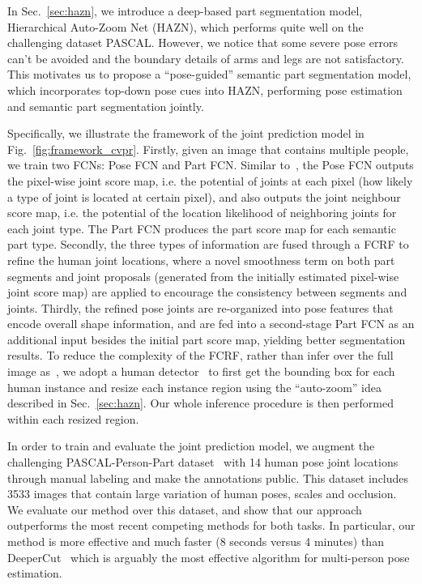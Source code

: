 In Sec.~\ref{sec:hazn}, we introduce a deep-based part segmentation model, Hierarchical Auto-Zoom Net (HAZN), which performs quite well on the challenging dataset PASCAL. However, we notice that some severe pose errors can't be avoided and the boundary details of arms and legs are not satisfactory.
This motivates us to propose a ``pose-guided'' semantic part segmentation model, which incorporates top-down pose cues into HAZN, performing pose estimation and semantic part segmentation jointly.

Specifically, we illustrate the framework of the joint prediction model in Fig.~\ref{fig:framework_cvpr}.
Firstly, given an image that contains multiple people, we train two FCNs: Pose FCN and Part FCN.
Similar to~\cite{insafutdinov2016deepercut}, the Pose FCN outputs the pixel-wise joint score map,
i.e. the potential of joints at each pixel (how likely a type of joint is located at certain pixel),
and also outputs the joint neighbour score map, i.e. the potential of the location likelihood of neighboring joints for each joint type.
The Part FCN produces the part score map for each semantic part type.
Secondly, the three types of information are fused through a FCRF to refine the human joint locations, where a novel smoothness term on both part segments and joint proposals (generated from the initially estimated pixel-wise joint score map) are applied to encourage the consistency between segments and joints.
Thirdly, the refined pose joints are re-organized into pose features that encode overall shape information, and are fed into a second-stage Part FCN as an additional input besides the initial part score map, yielding better segmentation results.
To reduce the complexity of the FCRF, rather than infer over the full image as~\cite{insafutdinov2016deepercut}, we adopt a human detector~\cite{ren2015faster} to first get the bounding box for each human instance and resize each instance region using the ``auto-zoom'' idea described in Sec.~\ref{sec:hazn}.
Our whole inference procedure is then performed within each resized region.

In order to train and evaluate the joint prediction model, we augment the challenging PASCAL-Person-Part dataset~\cite{chen2014detect} with 14 human pose joint locations through manual labeling and make the annotations public. This dataset includes 3533 images that contain large variation of human poses, scales and occlusion. We evaluate our method over this dataset, and show that our approach outperforms the most recent competing methods for both tasks. In particular, our method is more effective and much faster (8 seconds versus 4 minutes) than DeeperCut~\cite{insafutdinov2016deepercut} which is arguably the most effective algorithm for multi-person pose estimation.

